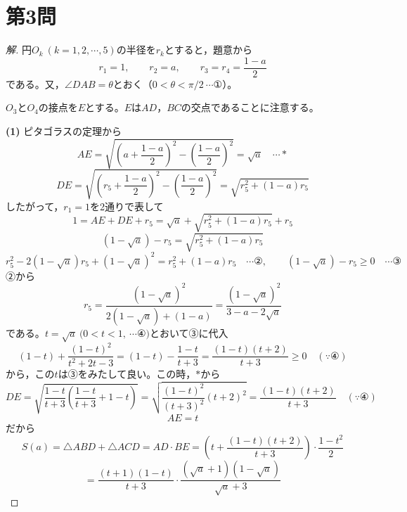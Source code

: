 \documentclass[../main.tex]{subfiles}
\begin{document}
\section*{第3問}

\begin{proof}[解]
  円$O_k\ (k=1,2,\cdots,5)$の半径を$r_k$とすると，題意から
  \[
    r_1=1, \qquad r_2=a, \qquad r_3=r_4=\frac{1-a}{2}
  \]
  である。又，$\angle DAB=\theta$とおく（$0<\theta<\pi/2\ \cdots$①）。

  \begin{center}
  \end{center}

  $O_3$と$O_4$の接点を$E$とする。$E$は$AD$，$BC$の交点であることに注意する。

  \textbf{(1)} ピタゴラスの定理から
  \[
    AE=\sqrt{\left(a+\frac{1-a}{2}\right)^2-\left(\frac{1-a}{2}\right)^2}=\sqrt{a} \quad\cdots *
  \]
  \[
    DE=\sqrt{\left(r_5+\frac{1-a}{2}\right)^2-\left(\frac{1-a}{2}\right)^2}=\sqrt{r_5^2+(1-a)r_5}
  \]
  したがって，$r_1=1$を2通りで表して
  \[
    1=AE+DE+r_5=\sqrt a+\sqrt{r_5^2+(1-a)r_5}+r_5
  \]
  \[
    (1-\sqrt a)-r_5=\sqrt{r_5^2+(1-a)r_5}
  \]
  \[
    r_5^2-2(1-\sqrt a)r_5+(1-\sqrt a)^2=r_5^2+(1-a)r_5 \quad\cdots\text{②}, \qquad (1-\sqrt a)-r_5\ge0\quad\cdots\text{③}
  \]
  ②から
  \[
    r_5=\frac{(1-\sqrt a)^2}{2(1-\sqrt a)+(1-a)}=\frac{(1-\sqrt a)^2}{3-a-2\sqrt a}
  \]
  である。$t=\sqrt a\ (0<t<1,\ \cdots$④$)$とおいて③に代入
  \[
    (1-t)+\frac{(1-t)^2}{t^2+2t-3}=(1-t)-\frac{1-t}{t+3}=\frac{(1-t)(t+2)}{t+3}\ge0\quad(\because④)
  \]
  から，この$t$は③をみたして良い。この時，$*$から
  \[
    DE=\sqrt{\frac{1-t}{t+3}\left(\frac{1-t}{t+3}+1-t\right)}=\sqrt{\frac{(1-t)^2}{(t+3)^2}(t+2)^2}=\frac{(1-t)(t+2)}{t+3}\quad(\because④)
  \]
  \[
    AE=t
  \]
  だから
  \[
    S(a)=\triangle ABD+\triangle ACD=AD\cdot BE=\left(t+\frac{(1-t)(t+2)}{t+3}\right)\cdot\frac{1-t^2}{2}
  \]
  \[
    =\frac{(t+1)(1-t)}{t+3}\cdot\frac{(\sqrt a+1)(1-\sqrt a)}{\sqrt a+3}
  \]


\end{proof}
\end{document}
